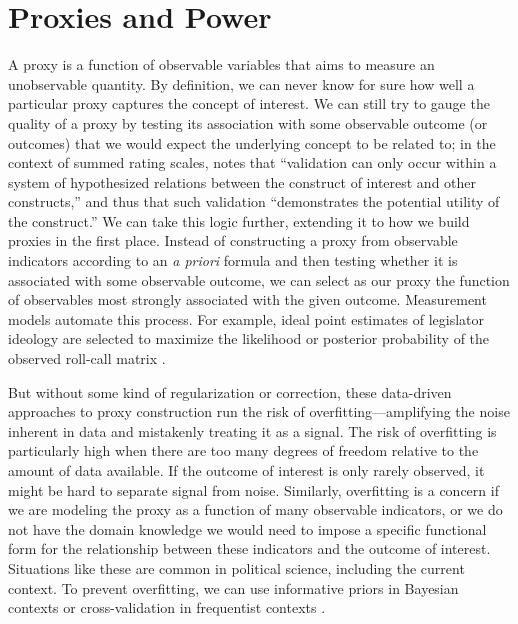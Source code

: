 
\section{Proxies and Power}

A proxy is a function of observable variables that aims to measure an unobservable quantity.
By definition, we can never know for sure how well a particular proxy captures the concept of interest.
We can still try to gauge the quality of a proxy by testing its association with some observable outcome (or outcomes) that we would expect the underlying concept to be related to; in the context of summed rating scales, \citet[46--47]{spector1992}  notes that ``validation can only occur within a system of hypothesized relations between the construct of interest and other constructs,'' and thus that such validation ``demonstrates the potential utility of the construct.''
We can take this logic further, extending it to how we build proxies in the first place.
Instead of constructing a proxy from observable indicators according to an \emph{a priori} formula and then testing whether it is associated with some observable outcome, we can select as our proxy the function of observables most strongly associated with the given outcome.
Measurement models automate this process.
For example, ideal point estimates of legislator ideology are selected to maximize the likelihood or posterior probability of the observed roll-call matrix \citep{poole1985,clinton2004}.

But without some kind of regularization or correction, these data-driven approaches to proxy construction run the risk of overfitting---amplifying the noise inherent in data and mistakenly treating it as a signal.
The risk of overfitting is particularly high when there are too many degrees of freedom relative to the amount of data available.
If the outcome of interest is only rarely observed, it might be hard to separate signal from noise.
Similarly, overfitting is a concern if we are modeling the proxy as a function of many observable indicators, or we do not have the domain knowledge we would need to impose a specific functional form for the relationship between these indicators and the outcome of interest.
Situations like these are common in political science, including the current context.
To prevent overfitting, we can use informative priors in Bayesian contexts \citep{clinton2004} or cross-validation in frequentist contexts \citep{Efron:2012es}.

